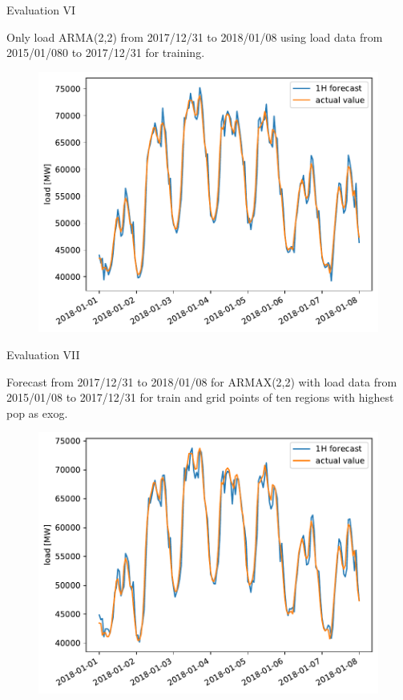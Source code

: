 \documentclass[t,xcolor={table},fleqn]{beamer}
\begin{document}
\begin{frame}{Evaluation VI}

Only load ARMA(2,2) from 2017/12/31 to 2018/01/08 using load data from 2015/01/080 to 2017/12/31 for training.

\begin{figure}[h!]%
\centering
\includegraphics[height=.8\textheight]{../doc/plots/ARMAXfc/ARMAX_p2q2_data2015to2017_fcto2018123100_plot_range2018010100_2018010800}%
\end{figure}

\end{frame}


\begin{frame}{Evaluation VII}

Forecast from 2017/12/31 to 2018/01/08 for ARMAX(2,2) with load data from 2015/01/08 to 2017/12/31 for train and grid points of ten regions with highest pop as exog.

\begin{figure}[h!]%
\centering
\includegraphics[height=.8\textheight]{../doc/plots/ARMAXfc/ARMAX_p2q2_data2015to2017_fcto2018123100_t2m_top10_plot_range2018010100_2018010800}%
\end{figure}

\end{frame}
\end{document}
